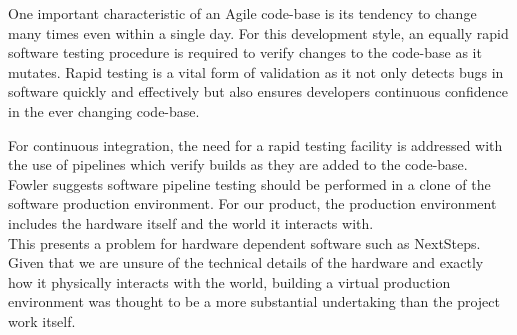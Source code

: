 \documentclass{l3proj}
\begin{document}
One important characteristic of an Agile code-base is its tendency to change many times even within a single day.
 For this development style, an equally rapid software testing procedure is required to verify changes to the code-base as it mutates. 
 Rapid testing is a vital form of validation as it not only detects bugs in software quickly and effectively but also ensures developers continuous confidence in the ever changing code-base.

For continuous integration, the need for a rapid testing facility is addressed with the use of pipelines which verify builds as they are added to the code-base\cite{fowler1}. 
Fowler suggests software pipeline testing should be performed in a clone of the software production environment\cite{fowler2}. For our product, the production environment includes the hardware itself and the world it interacts with.
\\This presents a problem for hardware dependent software such as NextSteps. Given that we are unsure of the technical details of the hardware and exactly how it physically interacts with the world, building a virtual production environment was thought to be a more substantial undertaking than the project work itself. 
\end{document}
